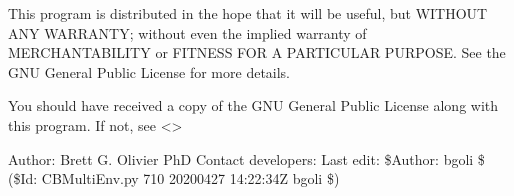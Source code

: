 \documentclass[letterpaper,12pt,english]{sphinxmanual}
\begin{document}
\sphinxAtStartPar
This program is distributed in the hope that it will be useful,
but WITHOUT ANY WARRANTY; without even the implied warranty of
MERCHANTABILITY or FITNESS FOR A PARTICULAR PURPOSE.  See the
GNU General Public License for more details.

\sphinxAtStartPar
You should have received a copy of the GNU General Public License
along with this program.  If not, see \textless{}\textgreater{}

\sphinxAtStartPar
Author: Brett G. Olivier PhD
Contact developers: 
Last edit: \$Author: bgoli \$ (\$Id: CBMultiEnv.py 710 2020\sphinxhyphen{}04\sphinxhyphen{}27 14:22:34Z bgoli \$)

\begin{fulllineitems}
\label{\detokenize{api/visualization:cbmpy.CBMultiEnv.addProteinCostAnnotation}}
\pysigstartsignatures
\pysiglinewithargsret
{}
{\sphinxparamcomma {}\sphinxparamcomma {}\sphinxparamcomma {}}
{}
\pysigstopsignatures
\end{fulllineitems}


\begin{fulllineitems}
\label{\detokenize{api/visualization:cbmpy.CBMultiEnv.scaleProteinCostAnnotation}}
\pysigstartsignatures
\pysiglinewithargsret
{}
{}
{}
\pysigstopsignatures
\end{fulllineitems}


\begin{fulllineitems}
\label{\detokenize{api/visualization:cbmpy.CBMultiEnv.runMultiStateFBA}}
\pysigstartsignatures
\pysiglinewithargsret
{}
{\sphinxparamcomma {}\sphinxparamcomma {}\sphinxparamcomma {}\sphinxparamcomma {}}
{}
\pysigstopsignatures
\end{fulllineitems}
\end{document}
